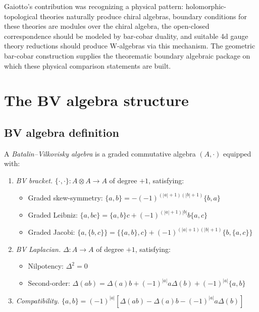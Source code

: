\begin{remark}
Gaiotto's contribution was recognizing a physical pattern: holomorphic-topological theories naturally produce chiral algebras, boundary conditions for these theories are modules over the chiral algebra, the open-closed correspondence should be modeled by bar-cobar duality, and suitable 4d gauge theory reductions should produce W-algebras via this mechanism.  The geometric bar-cobar construction supplies the theorematic boundary algebraic package on which these physical comparison statements are built.
\end{remark}


\section{The BV algebra structure}
\label{sec:complete-bv-structure}

\subsection{BV algebra definition}

\begin{definition}[BV algebra]
\label{def:bv-algebra-complete}
A \emph{Batalin--Vilkovisky algebra} is a graded commutative algebra $(A, \cdot)$ equipped with:
\begin{enumerate}
\item \emph{BV bracket.} $\{\cdot, \cdot\}: A \otimes A \to A$ of degree $+1$, satisfying:
\begin{itemize}
\item Graded skew-symmetry: $\{a, b\} = -(-1)^{(|a|+1)(|b|+1)} \{b, a\}$
\item Graded Leibniz: $\{a, bc\} = \{a, b\}c + (-1)^{(|a|+1)|b|} b\{a, c\}$
\item Graded Jacobi: $\{a, \{b, c\}\} = \{\{a, b\}, c\} + (-1)^{(|a|+1)(|b|+1)} \{b, \{a, c\}\}$
\end{itemize}

\item \emph{BV Laplacian.} $\Delta: A \to A$ of degree $+1$, satisfying:
\begin{itemize}
\item Nilpotency: $\Delta^2 = 0$
\item Second-order: $\Delta(ab) = \Delta(a)b + (-1)^{|a|}a\Delta(b) + (-1)^{|a|}\{a, b\}$
\end{itemize}

\item \emph{Compatibility.} $\{a, b\} = (-1)^{|a|} [\Delta(ab) - \Delta(a)b - (-1)^{|a|}a\Delta(b)]$
\end{enumerate}
\end{definition}

